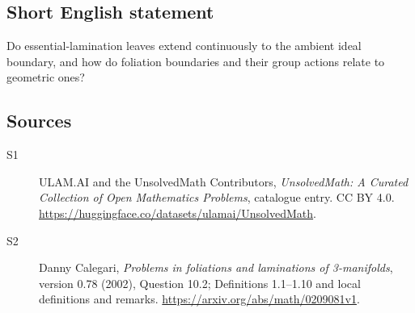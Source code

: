 \documentclass[11pt]{article}
\begin{document}
\subsection{Short English statement}
Do essential-lamination leaves extend continuously to the ambient ideal boundary, and how do foliation boundaries and their group actions relate to geometric ones?
\subsection{Sources}
\begin{description}
\item[\hypertarget{source:statement:1}{S1}] ULAM.AI and the UnsolvedMath Contributors, \emph{UnsolvedMath: A Curated Collection of Open Mathematics Problems}, catalogue entry. CC BY 4.0. \url{https://huggingface.co/datasets/ulamai/UnsolvedMath}.
\item[\hypertarget{source:statement:2}{S2}] Danny Calegari, \emph{Problems in foliations and laminations of 3-manifolds}, version 0.78 (2002), Question 10.2; Definitions 1.1--1.10 and local definitions and remarks. \url{https://arxiv.org/abs/math/0209081v1}.
\end{description}
\label{end:statement}
\end{document}
